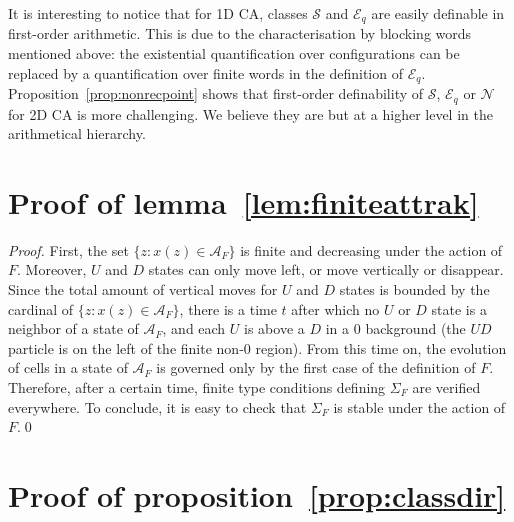 \documentclass{llncs}
\newcommand{\A}{\mathcal{A}}
\newcommand{\acf}{F}
\newcommand{\obst}{\Sigma_{\acf}}
\newcommand{\obstset}{\A_F}
\newcommand{\equpt}{\mathcal{E}_q}
\newcommand{\sensi}{\mathcal{S}}
\newcommand{\nono}{\mathcal{N}}
\begin{document}
It is interesting to notice that for 1D CA, classes $\sensi$ and
$\equpt$ are easily definable in first-order arithmetic. This is due
to the characterisation by blocking words mentioned above: the
existential quantification over configurations can be replaced by a
quantification over finite words in the definition of $\equpt$.
Proposition~\ref{prop:nonrecpoint} shows that first-order definability
of $\sensi$, $\equpt$ or $\nono$ for 2D CA is more challenging. We
believe they are but at a higher level in the arithmetical hierarchy.




\newpage
\appendix

\section{Proof of lemma~\ref{lem:finiteattrak}}

\begin{proof}
  First, the set ${\bigl\{z : x(z)\in\obstset\}}$ is finite and
  decreasing under the action of $\acf$. Moreover, $U$ and $D$ states
  can only move left, or move vertically or disappear. Since the total
  amount of vertical moves for $U$ and $D$ states is bounded by the
  cardinal of ${\bigl\{z : x(z)\in\obstset\}}$, there is a time $t$
  after which no $U$ or $D$ state is a neighbor of a state of
  $\obstset$, and each $U$ is above a $D$ in a $0$ background (the
  $UD$ particle is on the left of the finite non-$0$ region).  From
  this time on, the evolution of cells in a state of $\obstset$ is
  governed only by the first case of the definition of
  $\acf$. Therefore, after a certain time, finite type conditions
  defining $\obst$ are verified everywhere. To conclude, it is easy to
  check that $\obst$ is stable under the action of $\acf$.\qed
\end{proof}

\section{Proof of proposition~\ref{prop:classdir}}
\end{document}
